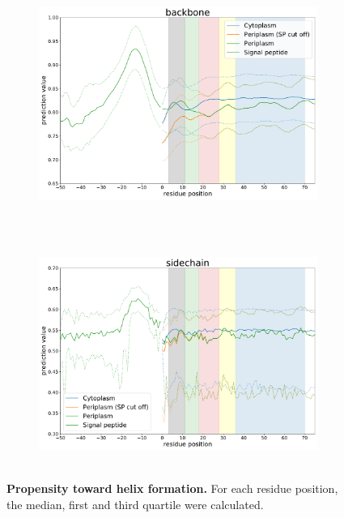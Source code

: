 ~\begin{figure}[h!]
	\ContinuedFloat
	~\begin{subfigure}[b]{\linewidth}
		\centering
		\includegraphics[width=\linewidth, height=0.37\textheight, keepaspectratio ]{./results/general_comparison/local_comparison/img/local_backbone.pdf}
		\label{fig:local_sheet}
	~\end{subfigure}
	\newline
	~\begin{subfigure}[b]{\linewidth}
		\centering
		\includegraphics[width=\linewidth, height=0.37\textheight, keepaspectratio ]{./results/general_comparison/local_comparison/img/local_sidechain.pdf}
		\label{fig:local_coil}
	~\end{subfigure}
	\caption{
		\textbf{Propensity toward helix formation.}
		For each residue position, the median, first and third quartile were calculated.	
}
\end{figure}
